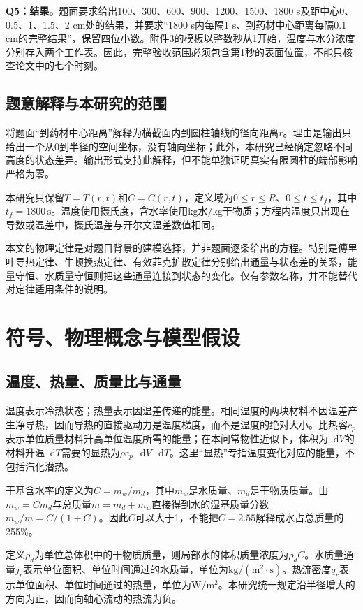 \documentclass[UTF8,a4paper,zihao=-4,fontset=none]{ctexart}
\numberwithin{equation}{section}
\newcommand{\dd}{\mathop{}\!\mathrm d}
\newcommand{\units}[1]{\,\mathrm{#1}}
\begin{document}
\textbf{Q5：结果。}题面要求给出100、300、600、900、1200、1500、1800 s及距中心0、0.5、1、1.5、2 cm处的结果，并要求“1800 s内每隔1 s、到药材中心距离每隔0.1 cm的完整结果”，保留四位小数。附件3的模板以整数秒从1开始，温度与水分浓度分别存入两个工作表。因此，完整验收范围必须包含第1秒的表面位置，不能只核查论文中的七个时刻。

\subsection{题意解释与本研究的范围}
将题面“到药材中心距离”解释为横截面内到圆柱轴线的径向距离$r$。理由是输出只给出一个从0到半径的空间坐标，没有轴向坐标；此外，本研究已经确定忽略不同高度的状态差异。输出形式支持此解释，但不能单独证明真实有限圆柱的端部影响严格为零。

本研究只保留$T=T(r,t)$和$C=C(r,t)$，定义域为$0\le r\le R$、$0\le t\le t_f$，其中$t_f=1800\units s$。温度使用摄氏度，含水率使用$\mathrm{kg}\text{水}/\mathrm{kg}\text{干物质}$；方程内温度只出现在导数或温差中，摄氏温差与开尔文温差数值相同。

本文的物理定律是对题目背景的建模选择，并非题面逐条给出的方程。特别是傅里叶导热定律、牛顿换热定律、有效菲克扩散定律分别给出通量与状态差的关系，能量守恒、水质量守恒则把这些通量连接到状态的变化。仅有参数名称，并不能替代对定律适用条件的说明。

\section{符号、物理概念与模型假设}
\subsection{温度、热量、质量比与通量}
温度表示冷热状态；热量表示因温差传递的能量。相同温度的两块材料不因温差产生净导热，因而导热的直接驱动力是温度梯度，而不是温度的绝对大小。比热容$c_p$表示单位质量材料升高单位温度所需的能量；在本问常物性近似下，体积为$\dd V$的材料升温$\dd T$需要的显热为$\rho c_p\,\dd V\,\dd T$。这里“显热”专指温度变化对应的能量，不包括汽化潜热。

干基含水率的定义为$C=m_w/m_d$，其中$m_w$是水质量、$m_d$是干物质质量。由$m_w=Cm_d$与总质量$m=m_d+m_w$直接得到水的湿基质量分数$m_w/m=C/(1+C)$。因此$C$可以大于1，不能把$C=2.55$解释成水占总质量的255\%。

定义$\rho_d$为单位总体积中的干物质质量，则局部水的体积质量浓度为$\rho_d C$。水质量通量$j_r$表示单位面积、单位时间通过的水质量，单位为$\mathrm{kg/(m^2\cdot s)}$。热流密度$q_r$表示单位面积、单位时间通过的热量，单位为$\mathrm{W/m^2}$。本研究统一规定沿半径增大的方向为正，因而向轴心流动的热流为负。
\end{document}
